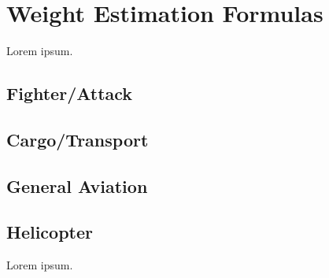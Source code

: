 \chapter{Weight Estimation Formulas}

Lorem ipsum. \cite{NASA-TP-2015-218751,Raymer1992}

\section{Fighter/Attack}

\section{Cargo/Transport}

\section{General Aviation}

\section{Helicopter}

Lorem ipsum. \cite{NASA-TP-2015-218751}
